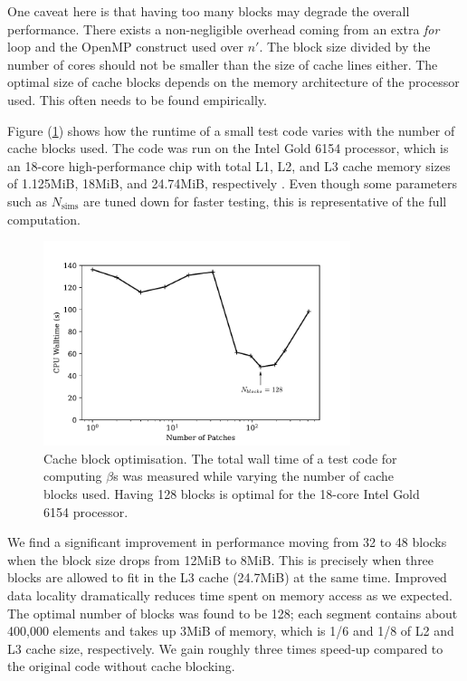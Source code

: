 One caveat here is that having too many blocks may degrade the overall performance. There exists a non-negligible overhead coming from an extra \textit{for} loop and the OpenMP construct used over $n'$. The block size divided by the number of cores should not be smaller than the size of cache lines either. The optimal size of cache blocks depends on the memory architecture of the processor used. This often needs to be found empirically.

Figure (\ref{fig:cache_block_optimisation}) shows how the runtime of a small test code varies with the number of cache blocks used. The code was run on the Intel Gold 6154 processor, which is an 18-core high-performance chip with total L1, L2, and L3 cache memory sizes of 1.125MiB, 18MiB, and 24.74MiB, respectively \cite{intel_data_sheet}. Even though some parameters such as $N_\text{sims}$ are tuned down for faster testing, this is representative of the full computation.

\begin{figure}[htbp!] 
	\centering    
	\includegraphics[width=0.8\textwidth]{cache_block_optimisation_annotated.pdf}
	\caption[Cache block optimisation]{Cache block optimisation. The total wall time of a test code for computing $\beta$s was measured while varying the number of cache blocks used. Having 128 blocks is optimal for the 18-core Intel Gold 6154 processor.}
	\label{fig:cache_block_optimisation}
\end{figure}

We find a significant improvement in performance moving from 32 to 48 blocks when the block size drops from 12MiB to 8MiB. This is precisely when three blocks are allowed to fit in the L3 cache (24.7MiB) at the same time. Improved data locality dramatically reduces time spent on memory access as we expected. The optimal number of blocks was found to be 128; each segment contains about 400,000 elements and takes up 3MiB of memory, which is 1/6 and 1/8 of L2 and L3 cache size, respectively. We gain roughly three times speed-up compared to the original code without cache blocking.

